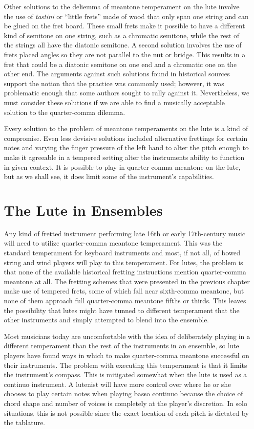 Other solutions to the deliemma of meantone temperament on the lute involve the use of
\textit{tastini} or ``little frets'' made of wood that only span one string
and can be glued on the fret board.  These small frets make it possible to have a different
kind of semitone on one string, such as a chromatic semitone, while the rest of the strings all
have the diatonic semitone.  A second solution involves the use of frets placed angles so they
are not parallel to the nut or bridge.  This results in a fret that could be a diatonic semitone
on one end and a chromatic one on the other end.  The arguments against such solutions found in
historical sources support the notion that the practice was commonly used; however, it was problematic
enough that some authors sought to rally against it. Nevertheless, we must consider these solutions
if we are able to find a musically acceptable solution to the quarter-comma dilemma.

Every solution to the problem of meantone temperaments on the lute is a kind of compromise.  Even
less devisive solutions included alternative frettings for certain notes and varying the
finger pressure of the left hand to alter the pitch enough to make it agreeable in a tempered
setting alter the instruments ability to function in given context.  It is possible to play in
quarter comma meantone on the lute, but as we shall see, it does limit some of the instrument's
capabilities.

\section{The Lute in Ensembles}

Any kind of fretted instrument performing late 16th or early 17th-century music will need to utilize
quarter-comma meantone temperament.  This was the standard temperament for keyboard instruments
and most, if not all, of bowed string and wind players will play to this temperament.  For lutes,
the problem is that none of the available historical fretting instructions mention quarter-comma
meantone at all.  The fretting schemes that were presented in the previous chapter make use of
tempered frets, some of which fall near sixth-comma meantone, but none of them approach
full quarter-comma meantone fifths or thirds.  This leaves the possibility that lutes
might have tunned to different temperament that the other instruments and simply attempted to
blend into the ensemble.

Most musicians today are uncomfortable with the idea of deliberately playing in a different temperament
than the rest of the instruments in an ensemble, so lute players have found ways in which to
make quarter-comma meantone successful on their instruments.
The problem with executing this temperament is that it limits the instrument's compass.  This is
mitigated somewhat when
the lute is used as a continuo instrument.  A lutenist will have
more control over where he or she chooses to play certain notes when playing basso continuo because the
choice of chord shape and number of voices is completely at the player's discretion.
In solo situations, this is not
possible since the exact location of each pitch is dictated by the tablature.

